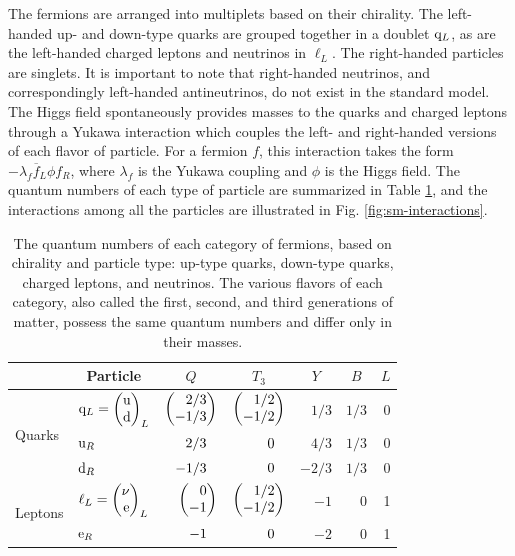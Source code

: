 The fermions are arranged into multiplets based on their chirality. The left-handed up- and down-type quarks are grouped together in a doublet $\mathrm{q}_L$, as are the left-handed charged leptons and neutrinos in $\ell_L$. The right-handed particles are singlets. It is important to note that right-handed neutrinos, and correspondingly left-handed antineutrinos, do not exist in the standard model. The Higgs field spontaneously provides masses to the quarks and charged leptons through a Yukawa interaction which couples the left- and right-handed versions of each flavor of particle. For a fermion $f$, this interaction takes the form $-\lambda_{f} \overline{f}_{L} \phi f_{R}$, where $\lambda_{f}$ is the Yukawa coupling and $\phi$ is the Higgs field. The quantum numbers of each type of particle are summarized in Table \ref{tab:q-num}, and the interactions among all the particles are illustrated in Fig. \ref{fig:sm-interactions}.

\begin{table}[htb]
  \begin{center}
    \begin{tabular}{|l||l|r|r|r|r|r|}
\hline
      & \multicolumn{1}{c|}{Particle} & \multicolumn{1}{c|}{$Q$} & \multicolumn{1}{c|}{$T_3$} & \multicolumn{1}{c|}{$Y$} & \multicolumn{1}{c|}{$B$} & \multicolumn{1}{c|}{$L$} \\
\hline
\hline
\multirow{3}{*}{Quarks}  
\rule{0pt}{24pt}         & $\cPq_L = \doublet[r]{\cPqu}{\cPqd}_L$ & $\doublet[r]{2/3}{-1/3}$ & $\doublet[r]{1/2}{-1/2}$ & $1/3$  & $1/3$ & 0 \\
                         & $\mathrm{u}_R$                              & $2/3\hphantom{\bigg)}$   & $0\hphantom{\bigg)}$     & $4/3$  & $1/3$ & 0 \\
                         & $\mathrm{d}_R$                              & $-1/3\hphantom{\bigg)}$  & $0\hphantom{\bigg)}$     & $-2/3$ & $1/3$ & 0 \\
\hline
\hline
\multirow{2}{*}{Leptons} 
\rule{0pt}{24pt}         & $\ell_L = \doublet[r]{\nu}{\Pe}_L$     & $\doublet[r]{0}{-1}$     & $\doublet[r]{1/2}{-1/2}$ & $-1$   & 0     & 1 \\
                         & $\mathrm{e}_R$                                & $-1\hphantom{\bigg)}$    & $0\hphantom{\bigg)}$     & $-2$   & 0     & 1 \\
\hline
    \end{tabular}
    \caption{The quantum numbers of each category of fermions, based on chirality and particle type: up-type quarks, down-type quarks, charged leptons, and neutrinos. The various flavors of each category, also called the first, second, and third generations of matter, possess the same quantum numbers and differ only in their masses.}
    \label{tab:q-num}
  \end{center}
\end{table}

